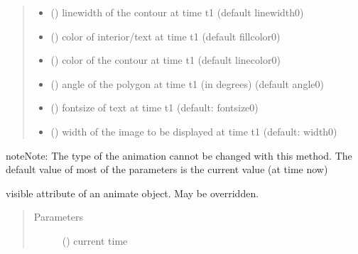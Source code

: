 \documentclass[letterpaper,10pt,english]{sphinxmanual}
\begin{document}
\begin{fulllineitems}
\begin{fulllineitems}
\begin{quote}
\begin{description}
\begin{itemize}
\item {} 
 () \textendash{} linewidth of the contour at time t1 (default linewidth0)

\item {} 
 () \textendash{} color of interior/text at time t1 (default fillcolor0)

\item {} 
 () \textendash{} color of the contour at time t1 (default linecolor0)

\item {} 
 () \textendash{} angle of the polygon at time t1 (in degrees) (default angle0)

\item {} 
 () \textendash{} fontsize of text at time t1 (default: fontsize0)

\item {} 
 () \textendash{} width of the image to be displayed at time t1 (default: width0) 

\end{itemize}

\end{description}\end{quote}

\begin{sphinxadmonition}{note}{Note:}
The type of the animation cannot be changed with this method. 
The default value of most of the parameters is the current value (at time now)
\end{sphinxadmonition}

\end{fulllineitems}


\begin{fulllineitems}
\label{\detokenize{Reference:salabim.Animate.visible}}
visible attribute of an animate object. May be overridden.
\begin{quote}\begin{description}
\item[{Parameters}] \leavevmode
{} () \textendash{} current time


\end{description}
\end{quote}
\end{fulllineitems}
\end{fulllineitems}
\end{document}

